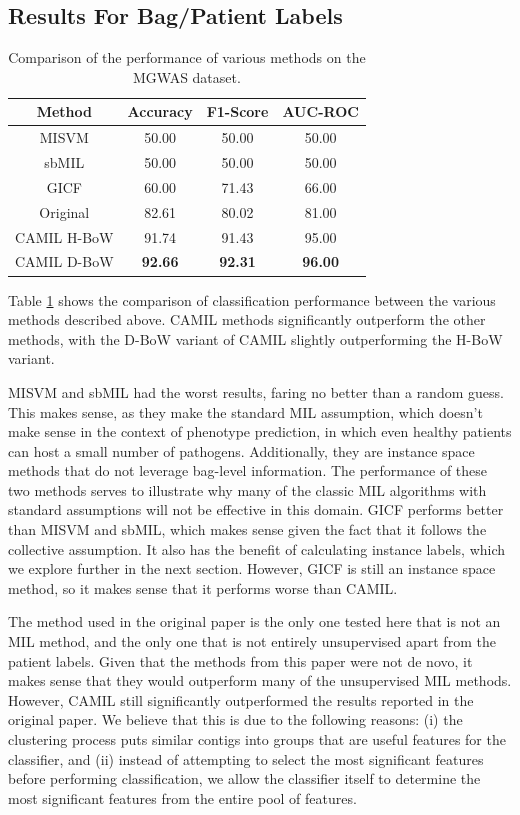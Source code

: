 

\subsection{Results For Bag/Patient Labels}

\begin{table}[h]
\begin{center}
\caption{Comparison of the performance of various methods on the MGWAS dataset. 
\label{tab:comp}}
\begin{tabular}{|c|ccc|}\hline
Method & Accuracy & F1-Score & AUC-ROC\\\hline
MISVM & 50.00 & 50.00 & 50.00\\\hline
sbMIL & 50.00 & 50.00 & 50.00\\\hline
GICF & 60.00 & 71.43 & 66.00\\\hline
Original & 82.61 & 80.02 & 81.00\\\hline 
CAMIL H-BoW & 91.74 & 91.43 & 95.00\\\hline
CAMIL D-BoW & \bf{92.66} & \bf{92.31} & \bf{96.00}\\\hline
\end{tabular}
\end{center}
\end{table}

Table \ref{tab:comp} shows the comparison of classification performance between the various methods described above. CAMIL methods significantly outperform the other methods, with the D-BoW variant of CAMIL slightly outperforming the H-BoW variant. 

MISVM and sbMIL had the worst results, faring no better than a random guess. This makes sense, as they make the standard MIL assumption, which doesn't make sense in the context of phenotype prediction, in which even healthy patients can host a small number of pathogens. Additionally, they are instance space methods that do not leverage bag-level information. The performance of these two methods serves to illustrate why many of the classic MIL algorithms with standard assumptions will not be effective in this domain. GICF performs better than MISVM and sbMIL, which makes sense given the fact that it follows the collective assumption. It also has the benefit of calculating instance labels, which we explore further in the next section. However, GICF is still an instance space method, so it makes sense that it performs worse than CAMIL.

The method used in the original paper is the only one tested here that is not an MIL method, and the only one that is not entirely unsupervised apart from the patient labels. Given that the methods from this paper were not de novo, it makes sense that they would outperform many of the unsupervised MIL methods. However, CAMIL still significantly outperformed the results reported in the original paper. We believe that this is due to the following reasons: (i) the clustering process puts similar contigs into groups that are useful features for the classifier, and (ii) instead of attempting to select the most significant features before performing classification, we allow the classifier itself to determine the most significant features from the entire pool of features.

